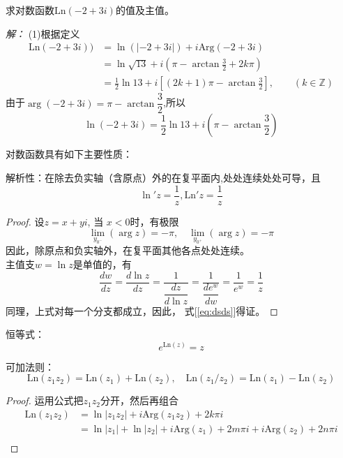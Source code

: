 \begin{example}
  求对数函数$\text{Ln}(-2 +3 i)$的值及主值。
\end{example}
\emph{解：} (1)根据定义
\[ \begin{aligned}
  \text{Ln}(-2 +3 i)) & = \ln(|-2 +3 i|) + i \text{Arg}(-2 +3 i) \\
  & = \ln \sqrt{13} + i \left( \pi - \arctan \frac{3}{2} + 2 k \pi \right)  \\
  & = \frac{1}{2} \ln 13 +i \left[ (2 k +1) \pi - \arctan \frac{3}{2}\right], \qquad (k \in \mathbb{Z}) 
\end{aligned}\]
由于$\arg(-2 +3 i) = \pi - \arctan \dfrac{3}{2}$,所以 
\[ \ln (-2 +3 i) = \frac{1}{2} \ln 13  + i \left( \pi - \arctan \dfrac{3}{2} \right)\]

对数函数具有如下主要性质：
\begin{compactenum}[(a)]
	\item 解析性：在除去负实轴（含原点）外的在复平面内,处处连续处处可导，且
  \begin{equation}\label{eq:dsds}
   \ln' z = \frac{1}{z} , \text{Ln}' z = \frac{1}{z}
  \end{equation}
  \begin{proof}
    设$z = x + yi$, 当 $x < 0$时，有极限
    \[ \lim\limits_{y_{0^-}} (\arg z) = - \pi, \quad \lim\limits_{y_{0^+}} (\arg z) = - \pi\]
    因此，除原点和负实轴外，在复平面其他各点处处连续。\\
    主值支$w = \ln z $是单值的，有
    \[ \frac{d w}{ d z} = \frac{d \ln z }{ d z}  = \frac{1 }{ \dfrac{ d z}{d \ln z }}  =   \frac{1 }{ \dfrac{ d e^w }{d w }}  =  \frac{1 }{e^w }  = \frac{1}{z} \]
    同理，上式对每一个分支都成立，因此， 式[\ref{eq:dsds}]得证。
  \end{proof}
  \item 恒等式：
  \begin{equation}
    e^{\text{Ln}(z)} = z
  \end{equation}
  \item 可加法则：
  \begin{equation}
    \text{Ln}(z_1 z_2) =  \text{Ln}(z_1) + \text{Ln}(z_2), \quad  \text{Ln}(z_1 / z_2) =  \text{Ln}(z_1) - \text{Ln}(z_2)
  \end{equation}
  \begin{proof}
    运用公式把$z_1 z_2$分开，然后再组合
    \[ \begin{aligned}
      \text{Ln}(z_1 z_2) &= \ln |z_1 z_2| + i \text{Arg} (z_1 z_2) + 2 k \pi i \\
      & = \ln |z_1|  + \ln |z_2| +  i \text{Arg} (z_1)  +  2 m \pi i + i \text{Arg} (z_2) + 2 n \pi i \\ 

\end{aligned}\]
\end{proof}
\end{compactenum}
